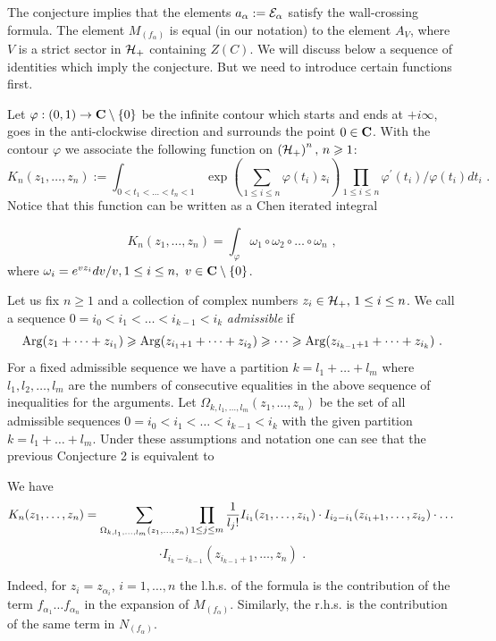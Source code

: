 \documentclass[12pt]{article}
\begin{document}
The conjecture implies that the elements $a_{\alpha}:={\cal E}_{\alpha}$ satisfy the wall-crossing formula. The element $M_{(f_{\alpha})}$ is equal (in our notation) to the element
$A_V$, where $V$ is a strict sector in ${\cal H}_+$ containing $Z(C)$.
We will discuss below a sequence of identities which imply the conjecture. But we need to introduce certain functions first.



Let  $\varphi:(0,1)\to {\bf C}\setminus\{0\}$ be the infinite contour which starts and ends at $+i\infty$, goes in the anti-clockwise direction and surrounds the point $0\in {\bf C}$. With the contour $\varphi$ we associate the following function on  
$\left({\cal H}_+\right)^n,\,n\geqslant 1$:
$$K_n(z_1,\dots,z_n):=\int_{0<t_1<\dots<t_n<1}\exp\left(\sum_{1\le i\le n}\varphi(t_i)z_i\right)\prod_{1\le i\le n}\varphi^{\prime}(t_i)/\varphi(t_i)dt_i\,\,.$$
Notice that this function can be written as a Chen iterated integral

$$K_n(z_1,\dots,z_n)=\int_{\varphi}\omega_1\circ\omega_2\circ\dots\circ \omega_n\,\,,$$
where $\omega_i=e^{v z_i}dv/v, 1\le i\le n,\,\, v\in {\bf C}\setminus \{0\}$.

Let us fix $n\geqslant 1$  and a collection of complex numbers $z_i\in {\cal H}_+, \,1\le i\le n$. We call a sequence $0=i_0<i_1<\dots<i_{k-1}<i_k$ {\it admissible} if
$$\operatorname{Arg}(z_1+\dots+z_{i_1})\geqslant  \operatorname{Arg}(z_{i_1+1}+\dots+z_{i_2})\geqslant \dots\geqslant \operatorname{Arg}(z_{i_{k-1}+1}+\dots+z_{i_k})\,\,.$$
For a fixed admissible sequence we have a partition $k=l_1+\dots+l_m$ where $l_1,l_2,\dots,l_m$ are the numbers of consecutive equalities in the above sequence of inequalities for the arguments.
Let $\Omega_{k,l_1,\dots,l_m}(z_1,\dots,z_n)$ be the set of all admissible sequences $0=i_0<i_1<\dots<i_{k-1}<i_k$
with the given partition $k=l_1+\dots+l_m$.
Under these assumptions and notation one can see that the previous Conjecture 2 is equivalent to

\begin{conj} We have
$$K_n(z_1,\dots,z_n)=\sum_{\Omega_{k,l_1,\dots,l_m}(z_1,\dots,z_n)}
\prod_{1\le j\le m}{1\over{l_j!}}{I}_{i_1}(z_1,\dots,z_{i_1})\cdot{I}_{i_2-i_1}(z_{i_1+1},\dots,z_{i_2})\cdot\dots$$
$$\cdot{I}_{i_k-i_{k-1}}(z_{i_{k-1}+1},\dots,z_{n})\,\,.$$

\end{conj}
Indeed, for $z_i=z_{\alpha_i},\,i=1,\dots,n$ the l.h.s. of the formula is the contribution of  the term 
$f_{\alpha_1}\dots f_{\alpha_n}$ in the expansion of $M_{(f_{\alpha})}$. Similarly, the r.h.s. is the contribution of the same
term in $N_{(f_{\alpha})}$.
\end{document}
